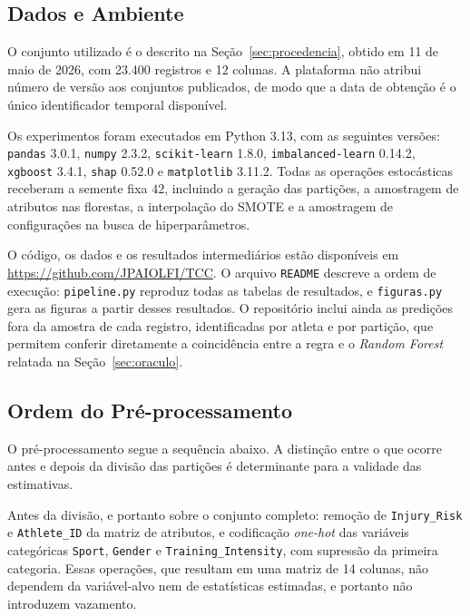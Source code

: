 \subsection{Dados e Ambiente}

O conjunto utilizado é o descrito na Seção~\ref{sec:procedencia}, obtido em 11 de maio de 2026, com 23.400 registros e 12 colunas. A plataforma não atribui número de versão aos conjuntos publicados, de modo que a data de obtenção é o único identificador temporal disponível.

Os experimentos foram executados em Python 3.13, com as seguintes versões: \texttt{pandas} 3.0.1, \texttt{numpy} 2.3.2, \texttt{scikit-learn} 1.8.0, \texttt{imbalanced-learn} 0.14.2, \texttt{xgboost} 3.4.1, \texttt{shap} 0.52.0 e \texttt{matplotlib} 3.11.2. Todas as operações estocásticas receberam a semente fixa $42$, incluindo a geração das partições, a amostragem de atributos nas florestas, a interpolação do SMOTE e a amostragem de configurações na busca de hiperparâmetros.

O código, os dados e os resultados intermediários estão disponíveis em \url{https://github.com/JPAIOLFI/TCC}. O arquivo \texttt{README} descreve a ordem de execução: \texttt{pipeline.py} reproduz todas as tabelas de resultados, e \texttt{figuras.py} gera as figuras a partir desses resultados. O repositório inclui ainda as predições fora da amostra de cada registro, identificadas por atleta e por partição, que permitem conferir diretamente a coincidência entre a regra e o \textit{Random Forest} relatada na Seção~\ref{sec:oraculo}.

\subsection{Ordem do Pré-processamento}
\label{sec:ordem_preproc}

O pré-processamento segue a sequência abaixo. A distinção entre o que ocorre antes e depois da divisão das partições é determinante para a validade das estimativas.

Antes da divisão, e portanto sobre o conjunto completo: remoção de \texttt{Injury\_Risk} e \texttt{Athlete\_ID} da matriz de atributos, e codificação \textit{one-hot} das variáveis categóricas \texttt{Sport}, \texttt{Gender} e \texttt{Training\_Intensity}, com supressão da primeira categoria. Essas operações, que resultam em uma matriz de 14 colunas, não dependem da variável-alvo nem de estatísticas estimadas, e portanto não introduzem vazamento.

